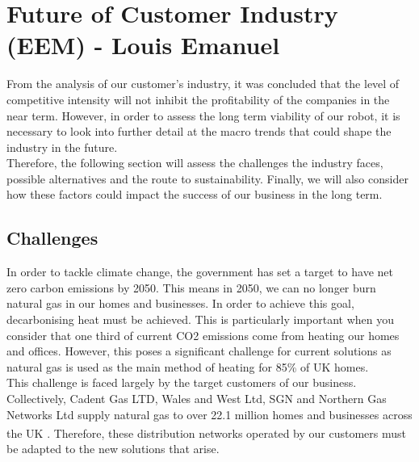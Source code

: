 \documentclass[11pt]{article}		%
\newcommand{\supercite}[1]{\textsuperscript{\cite{#1}}}		%
\begin{document}
        \section[Future of Customer Industry - EEM]{Future of Customer Industry (EEM) - Louis Emanuel}
		
    		From the analysis of our customer's industry, it was concluded that the level of competitive intensity will not inhibit the profitability of the companies in the near term. However, in order to assess the long term viability of our robot, it is necessary to look into further detail at the macro trends that could shape the industry in the future.\\
    	    \hspace*{3ex}Therefore, the following section will assess the challenges the industry faces, possible alternatives and the route to sustainability. Finally, we will also consider how these factors could impact the success of our business in the long term. 
    	    
    	    \subsection[Challenges]{Challenges}
            In order to tackle climate change, the government has set a target to have net zero carbon emissions by 2050. This means in 2050, we can no longer burn natural gas in our homes and businesses. In order to achieve this goal, decarbonising heat must be achieved. This is particularly important when you consider that one third of current CO2 emissions come from heating our homes and offices. However, this poses a significant challenge for current solutions as natural gas is used as the main method of heating for 85\% of UK homes.\\
            \hspace*{3ex}This challenge is faced largely by the target customers of our business. Collectively, Cadent Gas LTD, Wales and West Ltd, SGN and Northern Gas Networks Ltd supply natural gas to over 22.1 million homes and businesses across the UK \supercite{supplied}. Therefore, these distribution networks operated by our customers must be adapted to the new solutions that arise. 
    
\end{document}
